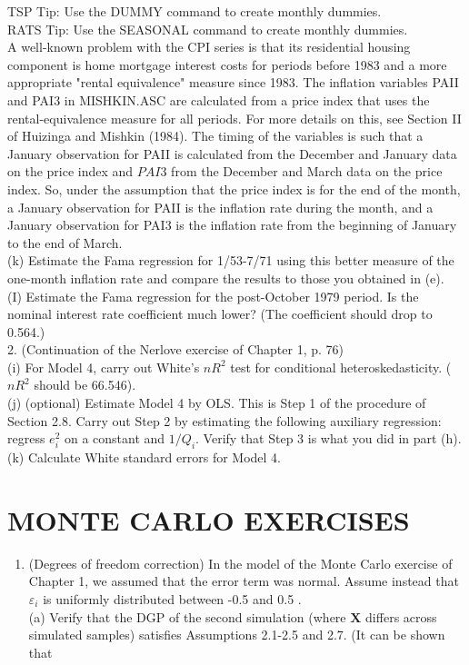 \documentclass[10pt]{article}
\begin{document}
TSP Tip: Use the DUMMY command to create monthly dummies.\\
RATS Tip: Use the SEASONAL command to create monthly dummies.\\
A well-known problem with the CPI series is that its residential housing component is home mortgage interest costs for periods before 1983 and a more appropriate "rental equivalence" measure since 1983. The inflation variables PAII and PAI3 in MISHKIN.ASC are calculated from a price index that uses the rental-equivalence measure for all periods. For more details on this, see Section II of Huizinga and Mishkin (1984). The timing of the variables is such that a January observation for PAII is calculated from the December and January data on the price index and $P A I 3$ from the December and March data on the price index. So, under the assumption that the price index is for the end of the month, a January observation for PAII is the inflation rate during the month, and a January observation for PAI3 is the inflation rate from the beginning of January to the end of March.\\
(k) Estimate the Fama regression for 1/53-7/71 using this better measure of the one-month inflation rate and compare the results to those you obtained in (e).\\
(I) Estimate the Fama regression for the post-October 1979 period. Is the nominal interest rate coefficient much lower? (The coefficient should drop to 0.564.)\\
2. (Continuation of the Nerlove exercise of Chapter 1, p. 76)\\
(i) For Model 4, carry out White's $n R^{2}$ test for conditional heteroskedasticity. ( $n R^{2}$ should be 66.546).\\
(j) (optional) Estimate Model 4 by OLS. This is Step 1 of the procedure of Section 2.8. Carry out Step 2 by estimating the following auxiliary regression: regress $e_{i}^{2}$ on a constant and $1 / Q_{i}$. Verify that Step 3 is what you did in part (h).\\
(k) Calculate White standard errors for Model 4.

\section*{MONTE CARLO EXERCISES}
\begin{enumerate}
  \item (Degrees of freedom correction) In the model of the Monte Carlo exercise of Chapter 1, we assumed that the error term was normal. Assume instead that $\varepsilon_{i}$ is uniformly distributed between -0.5 and 0.5 .\\
(a) Verify that the DGP of the second simulation (where $\mathbf{X}$ differs across simulated samples) satisfies Assumptions 2.1-2.5 and 2.7. (It can be shown that
\end{enumerate}
\end{document}
